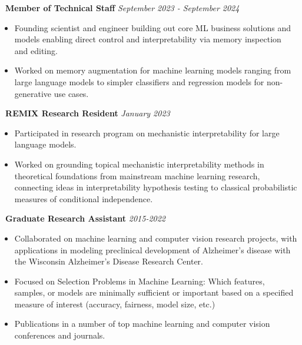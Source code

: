 \documentclass[]{article}
\begin{document}
 \newline
{\bf \ Member of Technical Staff} \hfill \textit{September 2023 - September 2024}
\begin{itemize}[label={$\bullet$}]
	\item Founding scientist and engineer building out core ML business solutions and models enabling direct control and interpretability via memory inspection and editing.
	\item Worked on memory augmentation for machine learning models ranging from large language models to simpler classifiers and regression models for non-generative use cases.
\end{itemize}

 \newline
{\bf \ REMIX Research Resident} \hfill \textit{January 2023}
\begin{itemize}[label={$\bullet$}]
	\item Participated in research program on mechanistic interpretability for large language models.
	\item Worked on grounding topical mechanistic interpretability methods in theoretical foundations from mainstream machine learning research, connecting ideas in interpretability hypothesis testing to classical probabilistic measures of conditional independence.
\end{itemize} 

 \newline
{\bf \ Graduate Research Assistant} \hfill \textit{2015-2022}
\begin{itemize}[label={$\bullet$}]
	\item Collaborated on machine learning and computer vision research projects, with applications in modeling preclinical development of Alzheimer's disease with the Wisconsin Alzheimer's Disease Research Center.
	\item Focused on Selection Problems in Machine Learning: Which features, samples, or models are minimally sufficient or important based on a specified measure of interest (accuracy, fairness, model size, etc.)
	\item Publications in a number of top machine learning and computer vision conferences and journals.
\end{itemize} 
\end{document}
